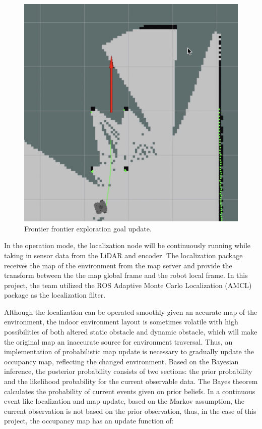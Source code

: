 \documentclass[11pt]{article}
\begin{document}
\begin{figure}[H]
    \centering
        \includegraphics[scale=.4, angle =0]{figures/SLAM-2.png}
    \caption{Frontier frontier exploration goal update.}
    \label{Frontier frontier exploration goal update.}
\end{figure}


In the operation mode, the localization node will be continuously running while taking in sensor data from the LiDAR and encoder. The localization package receives the map of the environment from the map server and provide the transform between the the map global frame and the robot local frame. In this project, the team utilized the ROS Adaptive Monte Carlo Localization (AMCL) package as the localization filter. 

Although the localization can be operated smoothly given an accurate map of the environment, the indoor environment layout is sometimes volatile with high possibilities of both altered static obstacle and dynamic obstacle, which will make the original map an inaccurate source for environment traversal. Thus, an implementation of probabilistic map update is necessary to gradually update the occupancy map, reflecting the changed environment. Based on the Bayesian inference, the posterior probability consists of two sections: the prior probability and the likelihood probability for the current observable data. The Bayes theorem calculates the probability of current events given on prior beliefs. In a continuous event like localization and map update, based on the Markov assumption, the current observation is not based on the prior observation, thus, in the case of this project, the occupancy map has an update function of:
\end{document}
